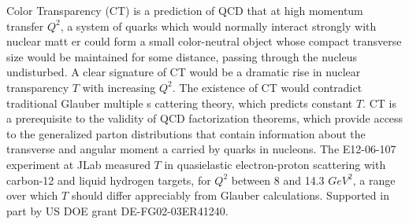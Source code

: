\noindent
Color Transparency (CT) is a prediction of QCD that at high momentum transfer
$Q ^2$, a system of quarks which would normally interact strongly with nuclear
matt er could form a small color-neutral object whose compact transverse size
would be maintained for some distance, passing through the nucleus undisturbed.
A clear signature of CT would be a dramatic rise in nuclear transparency $T$
with increasing $Q^2$. The existence of CT would contradict traditional Glauber
multiple s cattering theory, which predicts constant $T$. CT is a prerequisite
to the validity of QCD factorization theorems, which provide access to the
generalized parton distributions that contain information about the transverse
and angular moment a carried by quarks in nucleons. The E12-06-107 experiment
at JLab measured $T$ in quasielastic electron-proton scattering with carbon-12
and liquid hydrogen targets, for $Q^2$ between 8 and 14.3 $GeV^2$, a range over
which $T$ should differ appreciably from Glauber calculations. Supported in
part by US DOE grant DE-FG02-03ER41240.
